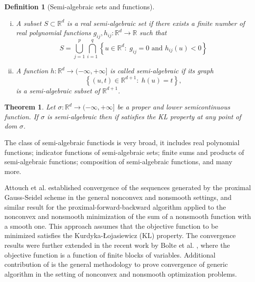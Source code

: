 \documentclass[12pt]{article}
\numberwithin{equation}{section}
\newtheorem{definition}{Definition}
\newtheorem{theorem}{Theorem}
\newcommand{\rr}{\mathbb{R}} %
\begin{document}
\begin{definition}[Semi-algebraic sets and functions] 
\begin{enumerate}[(i)]
	\item A subset $S \subset \rr^d$ is a real semi-algebraic set if there exists a finite number of real polynomial functions $g_{ij}, h_{ij}: \rr^d \rightarrow \rr$ such that
	\begin{equation*}
		S = \bigcup\limits_{j=1}^{p} \bigcap\limits_{i=1}^{q} \left\lbrace u \in \rr^d : \; g_{ij}=0 \text{ and } h_{ij}(u)<0 \right\rbrace
	\end{equation*}
	\item A function $h:\rr^d \rightarrow (-\infty, +\infty]$ is called semi-algebraic if its graph
	\begin{equation*}
		\left\lbrace (u,t)\in\rr^{d+1} : \; h(u)=t \right\rbrace ,
	\end{equation*}
	is a semi-algebraic subset of $\rr^{d+1}$.
\end{enumerate}
\end{definition}

\begin{theorem} \label{SA_is_KL}
Let $\sigma:\rr^d \rightarrow (-\infty, +\infty]$ be a proper and lower semicontinuous function. If $\sigma$ is semi-algebraic then if satisfies the KL property at any point of dom $\sigma$.
\end{theorem}
The class of semi-algebraic functiods is very broad, it includes real polynomial functions; indicator functions of semi-algebraic sets; finite sums and products of semi-algebraic functions; composition of semi-algebraic functions, and many more.

Attouch et al. \cite{AB2009, ABS2013} established convergence of the sequences generated by the proximal Gauss-Seidel scheme in the general nonconvex and nonsmooth settings, and similar result for the proximal-forward-backward algorithm applied to the nonconvex and nonsmooth minimization of the sum of a nonsmooth function with a smooth one. This approach assumes that the objective function to be minimized satisfies the Kurdyka-{\L}ojasiewicz (KL) property. The convergence results were further extended in the recent work by Bolte et al. \cite{BST2014}, where the objective function is a function of finite blocks of variables. Additional contribution of \cite{BST2014} is the general methodology to prove convergence of generic algorithm in the setting of nonconvex and nonsmooth optimization problems.
\end{document}
